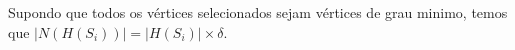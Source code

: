 






Supondo que todos os vértices selecionados sejam vértices de grau minimo, temos que $|N(H(S_i))|=|H(S_i)|\times\delta$.

